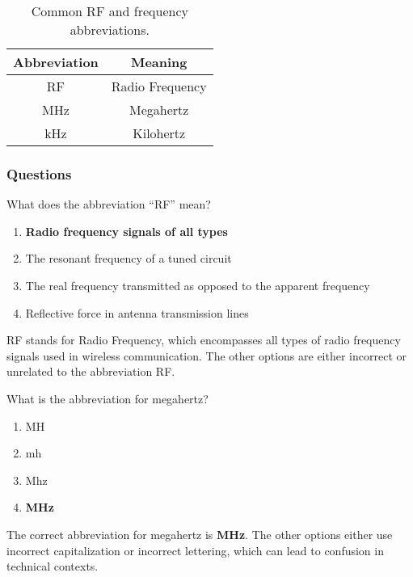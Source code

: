 \begin{table}[h]
    \centering
    \begin{tabular}{|c|c|}
        \hline
        \textbf{Abbreviation} & \textbf{Meaning} \\
        \hline
        RF & Radio Frequency \\
        MHz & Megahertz \\
        kHz & Kilohertz \\
        \hline
    \end{tabular}
    \caption{Common RF and frequency abbreviations.}
    \label{tab:rf-abbreviations}
\end{table}

\subsubsection*{Questions}

\begin{tcolorbox}[colback=gray!10!white,colframe=black!75!black,title={T5C06}]
    What does the abbreviation “RF” mean?
    \begin{enumerate}[label=\Alph*),noitemsep]
        \item \textbf{Radio frequency signals of all types}
        \item The resonant frequency of a tuned circuit
        \item The real frequency transmitted as opposed to the apparent frequency
        \item Reflective force in antenna transmission lines
    \end{enumerate}
\end{tcolorbox}

RF stands for Radio Frequency, which encompasses all types of radio frequency signals used in wireless communication. The other options are either incorrect or unrelated to the abbreviation RF.

\begin{tcolorbox}[colback=gray!10!white,colframe=black!75!black,title={T5C07}]
    What is the abbreviation for megahertz?
    \begin{enumerate}[label=\Alph*),noitemsep]
        \item MH
        \item mh
        \item Mhz
        \item \textbf{MHz}
    \end{enumerate}
\end{tcolorbox}

The correct abbreviation for megahertz is \textbf{MHz}. The other options either use incorrect capitalization or incorrect lettering, which can lead to confusion in technical contexts.
